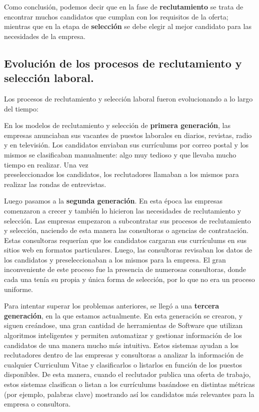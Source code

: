 \documentclass[12pt,a4paper]{article}
\begin{document}
\begin{sloppypar}
Como conclusión, podemos decir que en la fase de \textbf{reclutamiento} se trata de encontrar muchos candidatos que cumplan con los requisitos de la oferta; mientras que en la etapa de \textbf{selección} se debe elegir al mejor candidato para las necesidades de la empresa. 

\cleardoublepage    %

\subsection{Evolución de los procesos de reclutamiento y selección laboral.}
Los procesos de reclutamiento y selección laboral fueron evolucionando a lo largo del tiempo\cite{trabajos_relacionados_10}:

En los modelos de reclutamiento y selección de \textbf{primera generación}, las empresas anunciaban sus vacantes de puestos laborales en diarios, revistas, radio y en televisión. Los candidatos enviaban sus currículums por correo postal y los mismos se clasificaban manualmente: algo muy tedioso y que llevaba mucho tiempo en realizar. Una vez \\ preseleccionados los candidatos, los reclutadores llamaban a los mismos para realizar las rondas de entrevistas. 

Luego pasamos a la \textbf{segunda generación}. En esta época las empresas comenzaron a crecer y también lo hicieron las necesidades de reclutamiento y selección. Las empresas empezaron a subcontratar sus procesos de reclutamiento y selección, naciendo de esta manera las consultoras o agencias de contratación. Estas consultoras requerían que los candidatos cargaran sus currículums en sus sitios web en formatos particulares. Luego, las consultoras revisaban los datos de los candidatos y preseleccionaban a los mismos para la empresa. El gran inconveniente de este proceso fue la presencia de numerosas consultoras, donde cada una tenía su propia y única forma de selección, por lo que no era un proceso uniforme.

Para intentar superar los problemas anteriores, se llegó a una \textbf{tercera generación}, en la que estamos actualmente. En esta generación se crearon, y siguen creándose, una gran cantidad de herramientas de Software que utilizan algoritmos inteligentes y permiten automatizar y gestionar información de los candidatos de una manera mucho más intuitiva. Estos sistemas ayudan a los reclutadores dentro de las empresas y consultoras a analizar la información de cualquier Curriculum Vitae y clasificarlos o listarlos en función de los puestos disponibles. De esta manera, cuando el reclutador publica una oferta de trabajo, estos sistemas clasifican o listan a los currículums basándose en distintas métricas (por ejemplo, palabras clave) mostrando así los candidatos más relevantes para la empresa o consultora.


\end{sloppypar}
\end{document}
